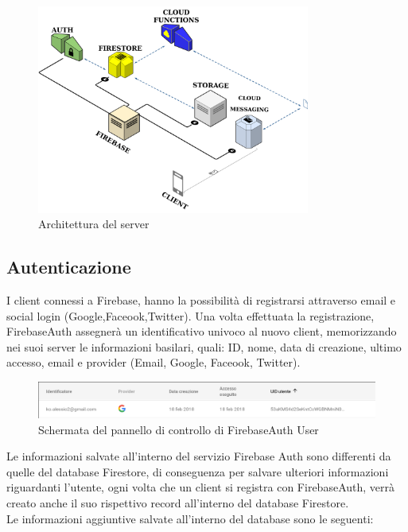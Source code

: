 \begin{figure}[!hb]
  \centering
  \includegraphics[width=0.8\textwidth]{immagini/server_arch.png}
  \caption{Architettura del server}\label{fig:Architettura del Server}
\end{figure}

\subsection{Autenticazione}
I client connessi a Firebase, hanno la possibilità di registrarsi attraverso email e social login (Google,Faceook,Twitter). Una volta effettuata la registrazione, FirebaseAuth assegnerà un identificativo univoco al nuovo client, memorizzando nei suoi server le informazioni basilari, quali: ID, nome, data di creazione, ultimo accesso, email e provider (Email, Google, Faceook, Twitter).
\begin{figure}[!h]
  \centering
  \includegraphics[width=1\textwidth]{immagini/firebase_auth_user.png}
  \caption{Schermata del pannello di controllo di FirebaseAuth User}\label{fig:Schermata del pannello di controllo di FirebaseAuth}
\end{figure}

Le informazioni salvate all'interno del servizio Firebase Auth sono differenti da quelle del database Firestore, di conseguenza per salvare ulteriori informazioni riguardanti l'utente, ogni volta che un client si registra con FirebaseAuth, verrà creato anche il suo rispettivo record all'interno del database Firestore.\\
Le informazioni aggiuntive salvate all'interno del database sono le seguenti:


